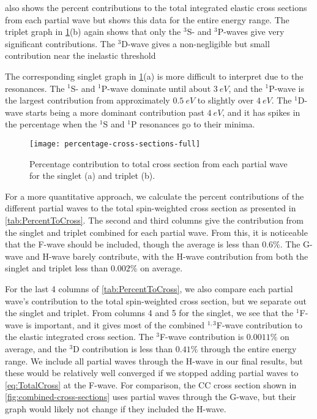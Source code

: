\documentclass[Dissertation.tex]{subfiles}
\begin{document}
 also shows the percent contributions to 
the total integrated elastic cross sections from each partial wave but shows
this data for the entire energy range. The triplet graph in
\cref{fig:percentage-cross-sections-full}(b) again shows that only the $^3$S- and
$^3$P-waves give very significant contributions. The $^3$D-wave gives a
non-negligible but small contribution near the inelastic threshold

The corresponding singlet graph in \cref{fig:percentage-cross-sections-full}(a)
is more difficult to interpret due to the resonances. The $^1$S- and
$^1$P-wave dominate until about $\SI{3}{eV}$, and the $^1$P-wave is the largest 
contribution from approximately $\SI{0.5}{eV}$ to slightly over $\SI{4}{eV}$.
The $^1$D-wave starts being a more dominant contribution past $\SI{4}{eV}$, and
it has spikes in the percentage when the $^1$S and $^1$P resonances go to their
minima.

\begin{figure}[H]
	\centering
	\texttt{[image: percentage-cross-sections-full]}
	\caption[Percentage contribution to total cross section]{Percentage contribution to total cross section from each partial wave for the singlet (a) and triplet (b).}
	\label{fig:percentage-cross-sections-full}
\end{figure}

For a more quantitative approach, we calculate the percent contributions of the
different partial waves to the total spin-weighted cross section as presented
in \cref{tab:PercentToCross}. The second and third columns give the
contribution from the singlet and triplet combined for each partial wave. From
this, it is noticeable that the F-wave should be included, though the average
is less than $0.6\%$. The G-wave and H-wave barely contribute, with the H-wave
contribution from both the singlet and triplet less than $0.002\%$ on 
average.

For the last 4 columns of \cref{tab:PercentToCross}, we also compare each
partial wave's contribution to the total spin-weighted cross section, but we
separate out the singlet and triplet. From columns 4 and 5 for the singlet,
we see that the $^1$F-wave is important, and it gives most of the combined
$^{1,3}$F-wave contribution to the elastic integrated cross section. The 
$^3$F-wave contribution is $0.0011\%$ on average, and the $^3$D contribution 
is less than $0.41\%$ through the entire energy range. We include all partial
waves through the H-wave in our final results, but these would be relatively
well converged if we stopped adding partial waves to \cref{eq:TotalCross} at
the F-wave. For comparison, the CC \cite{Walters2004} cross section shown in
\cref{fig:combined-cross-sections} uses partial waves through the G-wave, but
their graph would likely not change if they included the H-wave.
\end{document}

